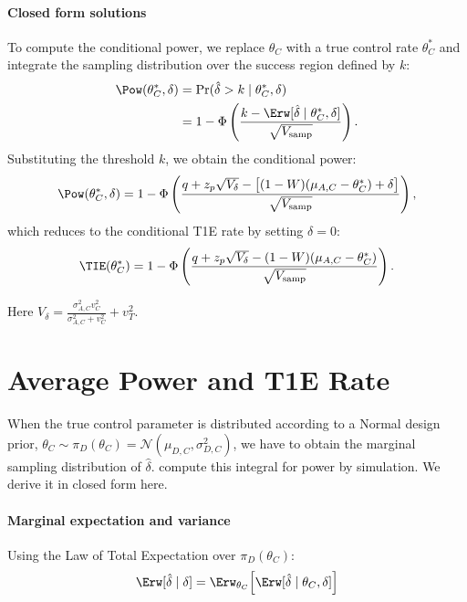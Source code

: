 \paragraph{Closed form solutions}
To compute the conditional power, we replace $\theta_C$ with a true control rate $\theta_C^*$ and integrate the sampling distribution over the success region defined by $k$:
\begin{align*}
    \Pow(\theta_C^*, \delta) &= \Pr(\hat{\delta} > k \mid \theta_C^*, \delta) \\
    &= 1 - \Phi\left( \frac{k - \Erw[\hat{\delta} \mid \theta_C^*, \delta]}{\sqrt{V_{\text{samp}}}} \right). 
\end{align*}
Substituting the threshold $k$, we obtain the conditional power:
\begin{equation} \label{eq:app_power_closed_form}
    \Pow(\theta_C^*, \delta) = 1 - \Phi\left( \frac{q + z_p \sqrt{V_{\delta}} - \big[(1 - W)(\mu_{A,C} - \theta_C^*) + \delta\big]}{\sqrt{V_{\text{samp}}}} \right),
\end{equation}
which reduces to the conditional T1E rate by setting $\delta = 0$: 
\begin{equation} \label{eq:app_t1e_closed_form}
    \TIE(\theta_C^*) = 1 - \Phi\left( \frac{q + z_p \sqrt{V_{\delta}} - (1 - W)(\mu_{A,C} - \theta_C^*)}{\sqrt{V_{\text{samp}}}} \right). 
\end{equation}

Here $V_{\delta} = \frac{\sigma_{A,C}^2 v_C^2}{\sigma_{A,C}^2 + v_C^2} + v_T^2$.


\section{Average Power and T1E Rate}
\label{sec:avgmetrics}
When the true control parameter is distributed according to a Normal design prior, $\theta_C \sim \pi_D(\theta_C) = \mathcal{N}(\mu_{D,C}, \sigma_{D,C}^2)$, we have to obtain the marginal sampling distribution of $\hat{\delta}$. \citet{walley2015advantages} compute this integral for power by simulation. We derive it in closed form here.

\paragraph{Marginal expectation and variance}
Using the Law of Total Expectation over $\pi_D(\theta_C)$:
    $$\Erw[\hat{\delta} \mid \delta] = \Erw_{\theta_C} \Big[ \Erw[\hat{\delta} \mid \theta_C, \delta] \Big] $$


